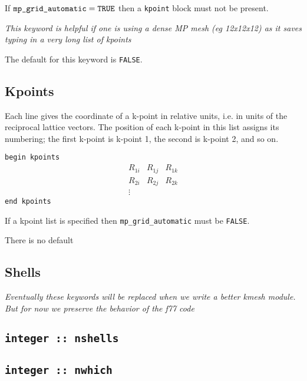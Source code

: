If $\verb#mp_grid_automatic#=\verb#TRUE#$ then a \verb#kpoint# block must not be present.


{\it This keyword is helpful if one is using a dense MP mesh (eg
  12x12x12) as it saves typing in a very long list of kpoints}

The default for this keyword is \verb#FALSE#.

\subsection[Kpoints]{Kpoints}
Each line gives the coordinate of a k-point
in relative units, i.e. in units of the reciprocal lattice
vectors.
The position  of each k-point in this
list assigns its numbering; the first k-point is k-point 1, the second
is k-point 2, and so on.


\noindent \verb#begin kpoints# \\
$$
\begin{array}{ccc}
 R_{1i} & R_{1j} & R_{1k} \\
 R_{2i} & R_{2j} & R_{2k} \\
\vdots
\end{array}
$$
\verb#end kpoints#

If a kpoint list is specified then \verb#mp_grid_automatic# must be
\verb#FALSE#.

There is no default


\subsection{Shells}

{\it Eventually these keywords will be replaced when we write a better
  kmesh module. But for now we preserve the behavior of the f77 code}



\subsection[nshells]{\tt integer :: nshells}

\subsection[nwhich]{\tt integer :: nwhich}


